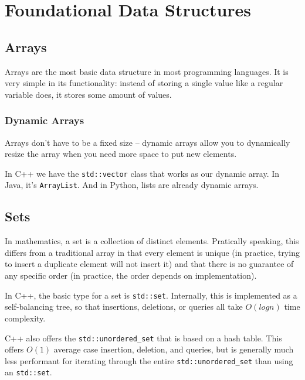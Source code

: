 \section{Foundational Data Structures}

\subsection{Arrays}

Arrays are the most basic data structure in most programming languages. It is very simple in its functionality: instead of storing a single value like a regular variable does, it stores some amount of values.

\subsubsection{Dynamic Arrays}
  

Arrays don't have to be a fixed size -- dynamic arrays allow you to dynamically resize the array when you need more space to put new elements.

In C++ we have the \texttt{std::vector} class that works as our dynamic array. In Java, it's \texttt{ArrayList}. And in Python, lists are already dynamic arrays.

\subsection{Sets}

In mathematics, a set is a collection of distinct elements. Pratically speaking, this differs from a traditional array in that every element is unique (in practice, trying to insert a duplicate element will not insert it) and that there is no guarantee of any specific order (in practice, the order depends on implementation).

In C++, the basic type for a set is \texttt{std::set}. Internally, this is implemented as a self-balancing tree, so that insertions, deletions, or queries all take $O(log n)$ time complexity.

C++ also offers the \texttt{std::unordered_set} that is based on a hash table. This offers $O(1)$ average case insertion, deletion, and queries, but is generally much less performant for iterating through the entire \texttt{std::unordered_set} than using an \texttt{std::set}.

